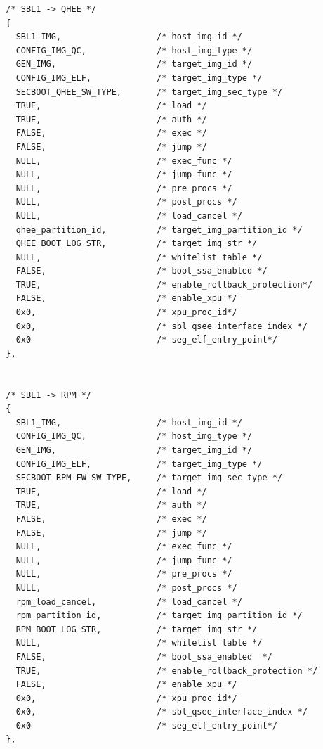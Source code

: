 \begin{lstlisting}
  /* SBL1 -> QHEE */
  {
    SBL1_IMG,                   /* host_img_id */
    CONFIG_IMG_QC,              /* host_img_type */
    GEN_IMG,                    /* target_img_id */
    CONFIG_IMG_ELF,             /* target_img_type */
    SECBOOT_QHEE_SW_TYPE,       /* target_img_sec_type */ 
    TRUE,                       /* load */
    TRUE,                       /* auth */
    FALSE,                      /* exec */
    FALSE,                      /* jump */
    NULL,                       /* exec_func */
    NULL,                       /* jump_func */
    NULL,                       /* pre_procs */ 
    NULL,                       /* post_procs */
    NULL,                       /* load_cancel */
    qhee_partition_id,          /* target_img_partition_id */
    QHEE_BOOT_LOG_STR,          /* target_img_str */
    NULL,                       /* whitelist table */
    FALSE,                      /* boot_ssa_enabled */
    TRUE,                       /* enable_rollback_protection*/
    FALSE,                      /* enable_xpu */
    0x0,                        /* xpu_proc_id*/    
    0x0,                        /* sbl_qsee_interface_index */
    0x0                         /* seg_elf_entry_point*/
  },


  /* SBL1 -> RPM */
  {
    SBL1_IMG,                   /* host_img_id */
    CONFIG_IMG_QC,              /* host_img_type */
    GEN_IMG,                    /* target_img_id */
    CONFIG_IMG_ELF,             /* target_img_type */
    SECBOOT_RPM_FW_SW_TYPE,     /* target_img_sec_type */ 
    TRUE,                       /* load */
    TRUE,                       /* auth */
    FALSE,                      /* exec */
    FALSE,                      /* jump */
    NULL,                       /* exec_func */
    NULL,                       /* jump_func */
    NULL,                       /* pre_procs */ 
    NULL,                       /* post_procs */
    rpm_load_cancel,            /* load_cancel */
    rpm_partition_id,           /* target_img_partition_id */
    RPM_BOOT_LOG_STR,           /* target_img_str */
    NULL,                       /* whitelist table */
    FALSE,                      /* boot_ssa_enabled  */
    TRUE,                       /* enable_rollback_protection */
    FALSE,                      /* enable_xpu */
    0x0,                        /* xpu_proc_id*/
    0x0,                        /* sbl_qsee_interface_index */
    0x0                         /* seg_elf_entry_point*/
  },


\end{lstlisting}
